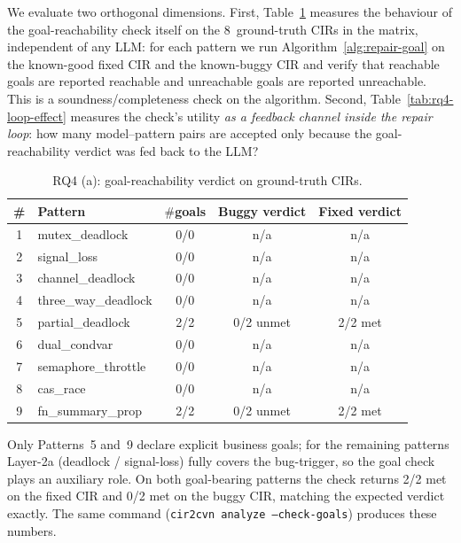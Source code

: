 We evaluate two orthogonal dimensions. First, Table~\ref{tab:rq4-goal-detection} measures the behaviour of the goal-reachability check itself on the 8~ground-truth CIRs in the matrix, independent of any LLM: for each pattern we run Algorithm~\ref{alg:repair-goal} on the known-good fixed CIR and the known-buggy CIR and verify that reachable goals are reported reachable and unreachable goals are reported unreachable. This is a soundness/completeness check on the algorithm. Second, Table~\ref{tab:rq4-loop-effect} measures the check's utility \emph{as a feedback channel inside the repair loop}: how many model--pattern pairs are accepted only because the goal-reachability verdict was fed back to the LLM?

\begin{table}[t]
\caption{RQ4 (a): goal-reachability verdict on ground-truth CIRs.}
\label{tab:rq4-goal-detection}
\centering\footnotesize
\begin{tabular}{@{}c l ccc@{}}
\toprule
\textbf{\#} & \textbf{Pattern}
   & $\#$\textbf{goals}
   & \textbf{Buggy verdict}
   & \textbf{Fixed verdict} \\
\midrule
1 & mutex\_deadlock     & 0/0 & n/a & n/a \\
2 & signal\_loss        & 0/0 & n/a & n/a \\
3 & channel\_deadlock   & 0/0 & n/a & n/a \\
4 & three\_way\_deadlock& 0/0 & n/a & n/a \\
5 & partial\_deadlock   & 2/2 & 0/2 unmet & 2/2 met \\
6 & dual\_condvar       & 0/0 & n/a & n/a \\
7 & semaphore\_throttle & 0/0 & n/a & n/a \\
8 & cas\_race           & 0/0 & n/a & n/a \\
9 & fn\_summary\_prop   & 2/2 & 0/2 unmet & 2/2 met \\
\bottomrule
\end{tabular}
\end{table}

Only Patterns~5 and~9 declare explicit business goals; for the remaining patterns Layer-2a (deadlock / signal-loss) fully covers the bug-trigger, so the goal check plays an auxiliary role. On both goal-bearing patterns the check returns \textsf{2/2 met} on the fixed CIR and \textsf{0/2 met} on the buggy CIR, matching the expected verdict exactly. The same command ({\tt cir2cvn analyze --check-goals}) produces these numbers.

